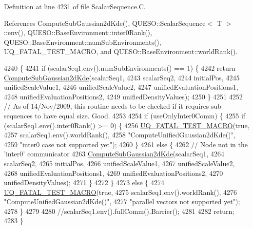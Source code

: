 Definition at line 4231 of file Scalar\-Sequence.\-C.



References Compute\-Sub\-Gaussian2d\-Kde(), Q\-U\-E\-S\-O\-::\-Scalar\-Sequence$<$ T $>$\-::env(), Q\-U\-E\-S\-O\-::\-Base\-Environment\-::inter0\-Rank(), Q\-U\-E\-S\-O\-::\-Base\-Environment\-::num\-Sub\-Environments(), U\-Q\-\_\-\-F\-A\-T\-A\-L\-\_\-\-T\-E\-S\-T\-\_\-\-M\-A\-C\-R\-O, and Q\-U\-E\-S\-O\-::\-Base\-Environment\-::world\-Rank().


\begin{DoxyCode}
4240 \{
4241   \textcolor{keywordflow}{if} (scalarSeq1.env().numSubEnvironments() == 1) \{
4242     \textcolor{keywordflow}{return} \hyperlink{namespace_q_u_e_s_o_af865210b84a63c53796aff42989c4af7}{ComputeSubGaussian2dKde}(scalarSeq1,
4243                                      scalarSeq2,
4244                                      initialPos,
4245                                      unifiedScaleValue1,
4246                                      unifiedScaleValue2,
4247                                      unifiedEvaluationPositions1,
4248                                      unifiedEvaluationPositions2,
4249                                      unifiedDensityValues);
4250   \}
4251 
4252   \textcolor{comment}{// As of 14/Nov/2009, this routine needs to be checked if it requires sub sequences to have equal size.
       Good.}
4253 
4254   \textcolor{keywordflow}{if} (useOnlyInter0Comm) \{
4255     \textcolor{keywordflow}{if} (scalarSeq1.env().inter0Rank() >= 0) \{
4256       \hyperlink{_defines_8h_a56d63d18d0a6d45757de47fcc06f574d}{UQ\_FATAL\_TEST\_MACRO}(\textcolor{keyword}{true},
4257                           scalarSeq1.env().worldRank(),
4258                           \textcolor{stringliteral}{"ComputeUnifiedGaussian2dKde()"},
4259                           \textcolor{stringliteral}{"inter0 case not supported yet"});
4260     \}
4261     \textcolor{keywordflow}{else} \{
4262       \textcolor{comment}{// Node not in the 'inter0' communicator}
4263       \hyperlink{namespace_q_u_e_s_o_af865210b84a63c53796aff42989c4af7}{ComputeSubGaussian2dKde}(scalarSeq1,
4264                                 scalarSeq2,
4265                                 initialPos,
4266                                 unifiedScaleValue1,
4267                                 unifiedScaleValue2,
4268                                 unifiedEvaluationPositions1,
4269                                 unifiedEvaluationPositions2,
4270                                 unifiedDensityValues);
4271     \}
4272   \}
4273   \textcolor{keywordflow}{else} \{
4274     \hyperlink{_defines_8h_a56d63d18d0a6d45757de47fcc06f574d}{UQ\_FATAL\_TEST\_MACRO}(\textcolor{keyword}{true},
4275                         scalarSeq1.env().worldRank(),
4276                         \textcolor{stringliteral}{"ComputeUnifiedGaussian2dKde()"},
4277                         \textcolor{stringliteral}{"parallel vectors not supported yet"});
4278   \}
4279 
4280   \textcolor{comment}{//scalarSeq1.env().fullComm().Barrier();}
4281 
4282   \textcolor{keywordflow}{return};
4283 \}
\end{DoxyCode}
